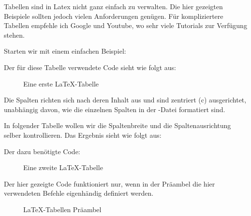 Tabellen sind in Latex nicht ganz einfach zu verwalten. Die hier gezeigten Beispiele sollten jedoch vielen Anforderungen genügen. Für kompliziertere Tabellen empfehle ich Google und Youtube, wo sehr viele Tutorials zur Verfügung stehen.

Starten wir mit einem einfachen Beispiel:



Der für diese Tabelle verwendete Code sieht wie folgt aus:

\begin{figure}[h!]
    \centering
      \caption{Eine erste LaTeX-Tabelle}
\end{figure} 

Die Spalten richten sich nach deren Inhalt aus und sind zentriert (c) ausgerichtet, unabhängig davon, wie die einzelnen Spalten in der -Datei formatiert sind. 

In folgender Tabelle wollen wir die Spaltenbreite und die Spaltenausrichtung selber kontrollieren. Das Ergebnis sieht wie folgt aus:   



Der dazu benötigte Code:

\begin{figure}[h!]
    \centering
      \caption{Eine zweite LaTeX-Tabelle}
\end{figure} 

Der hier gezeigte Code funktioniert nur, wenn in der Präambel die hier verwendeten Befehle eigenhändig definiert werden.

\begin{figure}[h!]
    \centering
      \caption{LaTeX-Tabellen Präambel}
\end{figure} 

